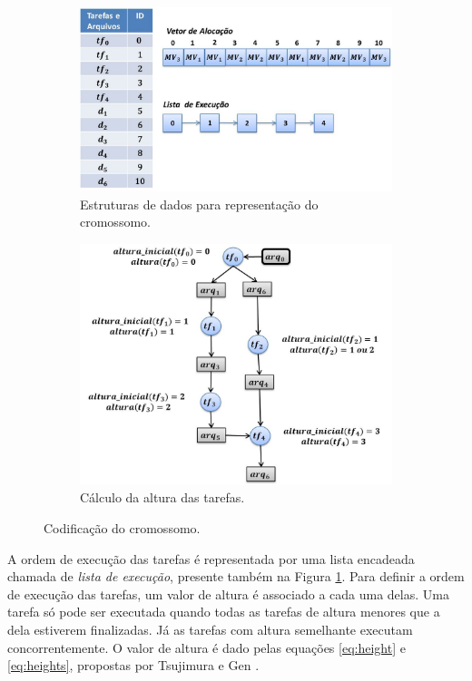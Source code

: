 \begin{figure}[H]
    \centering
    \begin{subfigure}{0.6\textwidth}
    \centering
        \includegraphics[width=1\linewidth]{figure/representacao.jpg}
        \caption{Estruturas de dados para representação do cromossomo.}
        \label{fig:encoding}
        \vspace{2\baselineskip}
    \end{subfigure}
    \begin{subfigure}{0.6\textwidth}
    \centering
        \includegraphics[width=0.9\linewidth]{figure/height.jpg}
        \caption{Cálculo da altura das tarefas.}
        \label{fig:height}
    \end{subfigure}
    \caption{Codificação do cromossomo.}
    \label{fig:representation}
    \end{figure}


A ordem de execução das tarefas é representada por uma lista encadeada chamada de \textit{lista de execução}, presente também  na Figura \ref{fig:encoding}. Para definir a ordem de execução das tarefas, um valor de altura é associado a cada uma delas. Uma tarefa só pode ser executada quando todas as tarefas de altura menores que a dela estiverem finalizadas. Já as tarefas com altura semelhante executam concorrentemente. O valor de altura é dado pelas equações \ref{eq:height}  e \ref{eq:heights}, propostas por Tsujimura e Gen \cite{Tsujimura1997}.

